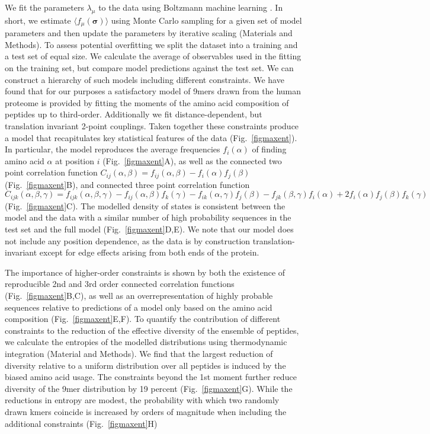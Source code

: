 \documentclass[superscriptaddress,twocolumn,pre]{revtex4}
\newcommand{\B}{\boldsymbol}
\newcommand{\<}{\langle}
\renewcommand{\>}{\rangle}
\begin{document}
We fit the parameters $\lambda_\mu$ to the data using Boltzmann machine learning \cite{Ackley1985}. In short, we estimate $\langle f_\mu(\B \sigma)\rangle$ using Monte Carlo sampling for a given set of model parameters and then update the parameters by iterative scaling (Materials and Methods). To assess potential overfitting we split the dataset into a training and a test set of equal size. We calculate the average of observables used in the fitting on the training set, but compare model predictions against the test set. We can construct a hierarchy of such models including different constraints. We have found that for our purposes a satisfactory model of 9mers drawn from the human proteome is provided by fitting the moments of the amino acid composition of peptides up to third-order. Additionally we fit distance-dependent, but translation invariant 2-point couplings. Taken together these constraints produce a model that recapitulates key statistical features of the data (Fig.~\ref{figmaxent}). In particular, the model reproduces the average frequencies $f_i(\alpha)$ of finding amino acid $\alpha$ at position $i$ (Fig.~\ref{figmaxent}A), as well as the connected two point correlation function $C_{ij}(\alpha, \beta) = f_{ij}(\alpha, \beta) - f_i(\alpha) f_j(\beta)$ (Fig.~\ref{figmaxent}B), and connected three point correlation function $C_{ijk}(\alpha, \beta, \gamma) = f_{ijk}(\alpha, \beta, \gamma) - f_{ij}(\alpha, \beta) f_k(\gamma) - f_{ik}(\alpha, \gamma) f_j(\beta) - f_{jk}(\beta, \gamma) f_i(\alpha) + 2 f_i(\alpha) f_j(\beta) f_k(\gamma)$ (Fig.~\ref{figmaxent}C). The modelled density of states is consistent between the model and the data with a similar number of high probability sequences in the test set and the full model (Fig.~\ref{figmaxent}D,E).
We note that our model does not include any position dependence, as the data is by construction translation-invariant except for edge effects arising from both ends of the protein. 

The importance of higher-order constraints is shown by both the existence of reproducible 2nd and 3rd order connected correlation functions (Fig.~\ref{figmaxent}B,C), as well as an overrepresentation of highly probable sequences relative to predictions of a model only based on the amino acid composition (Fig.~\ref{figmaxent}E,F). To quantify the contribution of different constraints to the reduction of the effective diversity of the ensemble of peptides, we calculate the entropies of the modelled distributions using thermodynamic integration (Material and Methods). We find that the largest reduction of diversity relative to a uniform distribution over all peptides is induced by the biased amino acid usage. The constraints beyond the 1st moment further reduce diversity of the 9mer distribution by 19 percent (Fig.~\ref{figmaxent}G). While the reductions in entropy are modest, the probability with which two randomly drawn kmers coincide is increased by orders of magnitude when including the additional constraints (Fig.~\ref{figmaxent}H)
\end{document}
